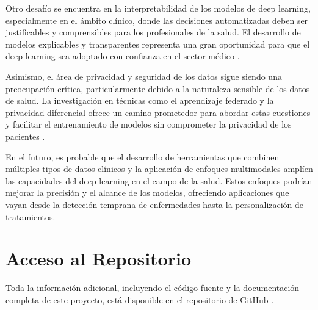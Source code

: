 \documentclass{article}
\begin{document}
Otro desafío se encuentra en la interpretabilidad de los modelos de deep learning, especialmente en el ámbito clínico, donde las decisiones automatizadas deben ser justificables y comprensibles para los profesionales de la salud. El desarrollo de modelos explicables y transparentes representa una gran oportunidad para que el deep learning sea adoptado con confianza en el sector médico \cite{holzinger2017we}.

Asimismo, el área de privacidad y seguridad de los datos sigue siendo una preocupación crítica, particularmente debido a la naturaleza sensible de los datos de salud. La investigación en técnicas como el aprendizaje federado y la privacidad diferencial ofrece un camino prometedor para abordar estas cuestiones y facilitar el entrenamiento de modelos sin comprometer la privacidad de los pacientes \cite{rieke2020future}.

En el futuro, es probable que el desarrollo de herramientas que combinen múltiples tipos de datos clínicos y la aplicación de enfoques multimodales amplíen las capacidades del deep learning en el campo de la salud. Estos enfoques podrían mejorar la precisión y el alcance de los modelos, ofreciendo aplicaciones que vayan desde la detección temprana de enfermedades hasta la personalización de tratamientos.


\newpage
\section{Acceso al Repositorio}

Toda la información adicional, incluyendo el código fuente y la documentación completa de este proyecto, está disponible en el repositorio de GitHub \cite{silva2024github}.

\end{document}
